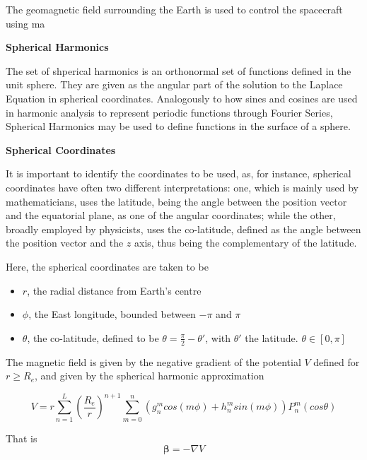 \graphicspath{{figures/}}
The geomagnetic field surrounding the Earth is used to control the spacecraft using ma


{\bf Spherical Harmonics}

The set of shperical harmonics is an orthonormal set of functions defined in the unit sphere. They are given as the angular part of the solution to the Laplace Equation in spherical coordinates. Analogously  to how sines and cosines are used in harmonic analysis to represent periodic functions through Fourier Series, Spherical Harmonics may be used to define functions in the surface of a sphere.

{\bf Spherical Coordinates}

It is important to identify the coordinates to be used, as, for instance, spherical coordinates have often two different interpretations: one, which is mainly used by mathematicians, uses the latitude, being the angle between the position vector and the equatorial plane, as one of the angular coordinates; while the other, broadly employed by physicists, uses the co-latitude, defined as the angle between the position vector and the $z$ axis, thus being the complementary of the latitude. 

Here, the spherical coordinates are taken to be
\begin{itemize} 
\item[] $r$, the radial distance from Earth's centre
\item[] $\phi$, the East longitude, bounded between $-\pi$ and $\pi$
\item[] $\theta$, the co-latitude, defined to be $\theta = \frac{\pi}{2} - \theta'$, with $\theta'$ the latitude. $\theta \in \left[0,\pi\right]$ %
\end{itemize}

The magnetic field is given by the negative gradient of the potential $V$ defined for $r \geq R_e$, and given by the spherical harmonic approximation

\begin{equation} \label{eq:igrf_potential}
V = r \sum_{n=1}^{L} \left(\dfrac{R_e}{r}\right)^{n+1} \sum_{m=0}^{n} \left(g_n^m cos(m\phi) + h_n^m sin(m\phi)\right) P_n^m(cos\theta)
\end{equation}

That is
\begin{equation}
{\bm \beta} = -\nabla V
\end{equation}

